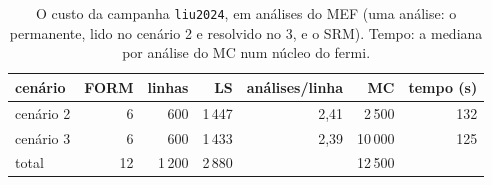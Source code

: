 \begin{table}[htbp]\centering\footnotesize
\caption{O custo da campanha \texttt{liu2024}, em análises do MEF (uma análise: o permanente, lido no cenário 2 e resolvido no 3, e o SRM). Tempo: a mediana por análise do MC num núcleo do fermi.}\label{tab:custo}
\begin{tabular}{lrrrrrr}\toprule
cenário & FORM & linhas & LS & análises/linha & MC & tempo (s) \\\midrule
cenário 2 & 6 & 600 & 1\,447 & 2{,}41 & 2\,500 & 132 \\
cenário 3 & 6 & 600 & 1\,433 & 2{,}39 & 10\,000 & 125 \\
\midrule total & 12 & 1\,200 & 2\,880 & & 12\,500 & \\
\bottomrule\end{tabular}\end{table}
